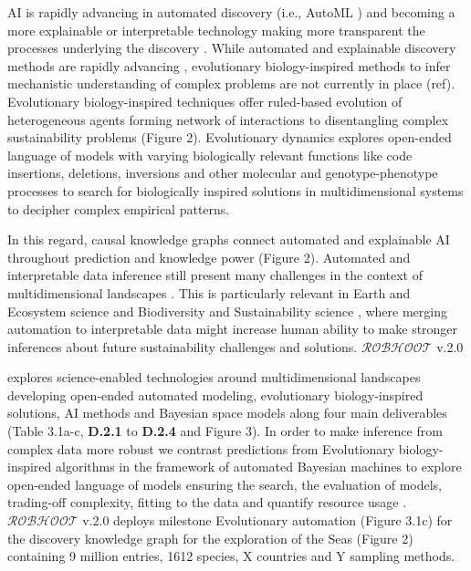 \documentclass[11pt, a4paper]{article} %
\begin{document}
{AI is rapidly advancing in automated discovery (i.e., AutoML
\citep{Real2020}) and becoming a more explainable or interpretable
technology making more transparent the processes underlying the
discovery \citep{Gil2019,Futia2020}. While automated and explainable
discovery methods are rapidly advancing \citep{Guimera2020, ++ refs},
evolutionary biology-inspired methods to infer mechanistic
understanding of complex problems are not currently in place
(ref). Evolutionary biology-inspired techniques offer ruled-based
evolution of heterogeneous agents forming network of interactions to
disentangling complex sustainability problems (Figure 2). Evolutionary
dynamics explores open-ended language of models with varying
biologically relevant functions like code insertions, deletions,
inversions and other molecular and genotype-phenotype processes to
search for biologically inspired solutions in multidimensional systems
to decipher complex empirical patterns.

In this regard, causal knowledge graphs connect automated and
explainable AI throughout prediction and knowledge power (Figure
2). Automated and interpretable data inference still present many
challenges in the context of multidimensional landscapes
\citep{OHare2015,Cranmer2019}. This is particularly relevant in Earth
and Ecosystem science and Biodiversity and Sustainability science
\citep{Reichstein}, where merging automation to interpretable data
might increase human ability to make stronger inferences about future
sustainability challenges and solutions. $\mathcal{ROBHOOT}$ v.2.0}
explores science-enabled technologies around multidimensional
landscapes developing open-ended automated modeling, evolutionary
biology-inspired solutions, AI methods and Bayesian space models along
four main deliverables (Table 3.1a-c, {\bf D.2.1} to {\bf D.2.4} and
Figure 3). In order to make inference from complex data more robust we
contrast predictions from Evolutionary biology-inspired algorithms in
the framework of automated Bayesian machines to explore open-ended
language of models ensuring the search, the evaluation of models,
trading-off complexity, fitting to the data and quantify resource
usage \citep{Guimera2020,Steinruecken}. $\mathcal{ROBHOOT}$ v.2.0
deploys milestone Evolutionary automation (Figure 3.1c) for the
discovery knowledge graph for the exploration of the Seas (Figure 2)
containing 9 million entries, 1612 species, X countries and Y sampling
methods.
\end{document}
